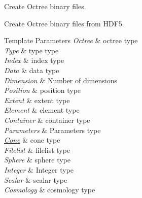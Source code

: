 Create Octree binary files. 

Create Octree binary files from H\-D\-F5. 
\begin{DoxyTemplParams}{Template Parameters}
{\em Octree} & octree type \\
\hline
{\em Type} & type type \\
\hline
{\em Index} & index type \\
\hline
{\em Data} & data type \\
\hline
{\em Dimension} & Number of dimensions \\
\hline
{\em Position} & position type \\
\hline
{\em Extent} & extent type \\
\hline
{\em Element} & element type \\
\hline
{\em Container} & container type \\
\hline
{\em Parameters} & Parameters type \\
\hline
{\em \hyperlink{exceptionCone}{Cone}} & cone type \\
\hline
{\em Filelist} & filelist type \\
\hline
{\em Sphere} & sphere type \\
\hline
{\em Integer} & Integer type \\
\hline
{\em Scalar} & scalar type \\
\hline
{\em Cosmology} & cosmology type \\
\hline
\end{DoxyTemplParams}

